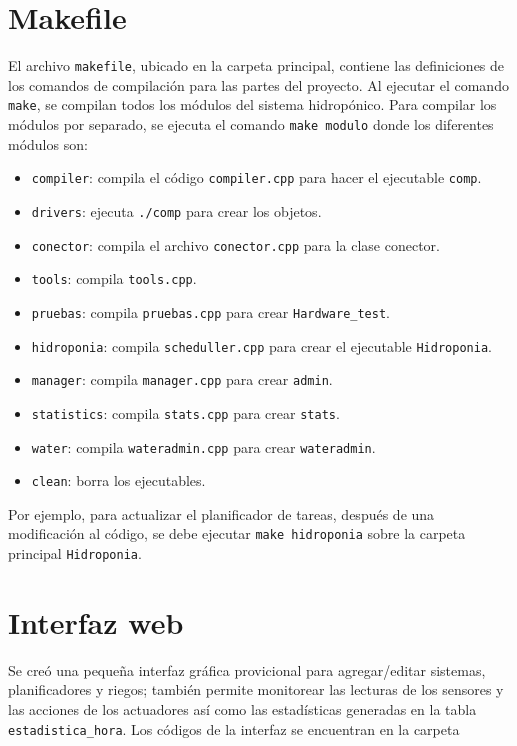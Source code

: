 \documentclass[a4paper,10pt,titlepage]{article}
\begin{document}
\section{Makefile}
El archivo \verb|makefile|, ubicado en la carpeta principal, contiene las definiciones de los comandos de compilaci\'on para las partes del proyecto. Al ejecutar el comando 
\verb|make|, se compilan todos los m\'odulos del sistema hidrop\'onico. Para compilar los m\'odulos por separado, se ejecuta el comando \verb|make modulo| donde los 
diferentes m\'odulos son:
\begin{itemize}
\item \verb|compiler|: compila el c\'odigo \verb|compiler.cpp| para hacer el ejecutable \verb|comp|.
\item \verb|drivers|: ejecuta \verb|./comp| para crear los objetos.
\item \verb|conector|: compila el archivo \verb|conector.cpp| para la clase conector.
\item \verb|tools|: compila \verb|tools.cpp|.
\item \verb|pruebas|: compila \verb|pruebas.cpp| para crear \verb|Hardware_test|.
\item \verb|hidroponia|: compila \verb|scheduller.cpp| para crear el ejecutable \verb|Hidroponia|.
\item \verb|manager|: compila \verb|manager.cpp| para crear \verb|admin|.
\item \verb|statistics|: compila \verb|stats.cpp| para crear \verb|stats|.
\item \verb|water|: compila \verb|wateradmin.cpp| para crear \verb|wateradmin|.
\item \verb|clean|: borra los ejecutables.
\end{itemize}

Por ejemplo, para actualizar el planificador de tareas, despu\'es de una modificaci\'on al c\'odigo, se debe ejecutar \verb|make hidroponia| sobre la carpeta principal 
\verb|Hidroponia|.

\section{Interfaz web}
Se cre\'o una peque\~na interfaz gr\'afica provicional para agregar/editar sistemas, planificadores y riegos; tambi\'en  permite monitorear las lecturas de los sensores y 
las acciones de 
los actuadores as\'i como las estad\'isticas generadas en la tabla \verb|estadistica_hora|. 
Los c\'odigos de la interfaz se encuentran en la carpeta
\end{document}
